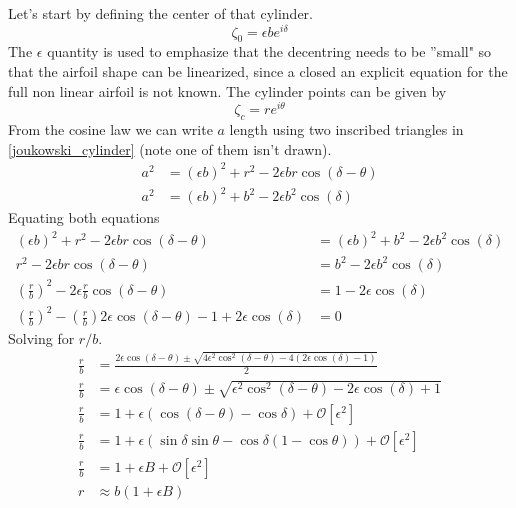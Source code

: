 \newpage
Let's start by defining the center of that cylinder.
\begin{equation}
    \zeta_0 = \epsilon b e^{i\delta} 
\end{equation}
The $\epsilon$ quantity is used to emphasize that the decentring needs to be ''small" so that the airfoil shape can be linearized, since a closed an explicit equation
for the full non linear airfoil is not known.
The cylinder points can be given by 
\begin{equation}
    \zeta_{c} =  r e^{i\theta} 
\end{equation}
From the cosine law  we can write $a$ length using two inscribed triangles in \ref{joukowski_cylinder} (note one of them isn't drawn).
\begin{align}
    a^2 &= (\epsilon b)^2 + r^2 - 2\epsilon b r \cos(\delta - \theta) \\
    a^2 &= (\epsilon b)^2 + b^2 - 2\epsilon b^2  \cos(\delta) 
\end{align}
Equating both equations 
\begin{align}
     (\epsilon b)^2 + r^2 - 2\epsilon b r \cos(\delta - \theta) &=  (\epsilon b)^2 + b^2 - 2\epsilon b^2  \cos(\delta)  \\
      r^2 - 2\epsilon b r \cos(\delta - \theta) &=   b^2 - 2\epsilon b^2  \cos(\delta) \\
      \left(\frac{r}{b}\right)^2 - 2\epsilon \frac{r}{b} \cos(\delta - \theta) &=   1 - 2\epsilon \cos(\delta) \\
      \left(\frac{r}{b}\right)^2 -  \left(\frac{r}{b}\right)2\epsilon \cos(\delta - \theta) -  1 + 2\epsilon \cos(\delta) &= 0
\end{align}
Solving for $r/b$.
\begin{align}
    \frac{r}{b} &= \frac{2\epsilon \cos(\delta - \theta) \pm \sqrt{4\epsilon^2 \cos^2(\delta - \theta)-4(  2\epsilon \cos(\delta)- 1)}} {2} \\
    \frac{r}{b} &= \epsilon \cos(\delta - \theta) \pm \sqrt{\epsilon^2 \cos^2(\delta - \theta)- 2\epsilon \cos(\delta)+ 1} \\
    \frac{r}{b} &= 1 + \epsilon \left( \cos(\delta -\theta) - \cos\delta \right) + \mathcal{O}[\epsilon^2]  \\
    \frac{r}{b} &= 1 + \epsilon \left( \sin\delta \sin\theta - \cos\delta \left(1 -\cos\theta \right) \right) + \mathcal{O}[\epsilon^2]  \\
    \frac{r}{b} &= 1 + \epsilon B + \mathcal{O}[\epsilon^2] \\
    r &\approx b\left(1 + \epsilon B \right)
\end{align}

